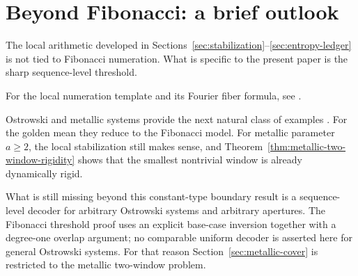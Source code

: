 \section{Beyond Fibonacci: a brief outlook}\label{sec:generalization}

The local arithmetic developed in Sections~\ref{sec:stabilization}--\ref{sec:entropy-ledger} is not tied to Fibonacci numeration. What is specific to the present paper is the sharp sequence-level threshold.

\begin{proposition}\label{prop:gen-fiber}
For the local numeration template and its Fourier fiber formula, see
\cite[Proposition~\textnormal{``Local numeration template''}]{MaZhang2026Nonlinearity}.
\end{proposition}

Ostrowski and metallic systems provide the next natural class of examples \cite{Ostrowski1922,Berthe2001Ostrowski,AlloucheShallit2003}. For the golden mean they reduce to the Fibonacci model. For metallic parameter $a\ge2$, the local stabilization still makes sense, and Theorem~\ref{thm:metallic-two-window-rigidity} shows that the smallest nontrivial window is already dynamically rigid.

What is still missing beyond this constant-type boundary result is a sequence-level decoder for arbitrary Ostrowski systems and arbitrary apertures. The Fibonacci threshold proof uses an explicit base-case inversion together with a degree-one overlap argument; no comparable uniform decoder is asserted here for general Ostrowski systems. For that reason Section~\ref{sec:metallic-cover} is restricted to the metallic two-window problem.
